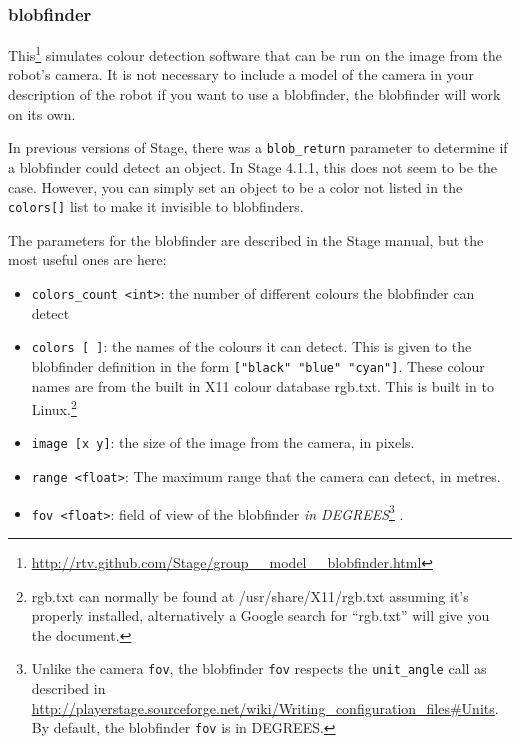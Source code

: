 \documentclass[a4paper]{report}
\begin{document}
\subsubsection{blobfinder}
This\footnote{\url{http://rtv.github.com/Stage/group__model__blobfinder.html}}
simulates colour detection software that can be run on the image from the
robot's camera. It is not necessary to include a model of the camera in
your description of the robot if you want to use a blobfinder, the
blobfinder will work on its own. 

In previous versions of Stage, there was a {\tt blob\_return}
parameter to determine if a blobfinder could detect an object.  In Stage
4.1.1, this does not seem to be the case.  However, you can simply set an
object to be a color not listed in the {\tt colors[]} list to make it invisible
to blobfinders.

The parameters for the blobfinder are described in the Stage manual, but
the most useful ones are here:
\begin{itemize}
      \item \verb|colors_count <int>|: the number of different colours the
            blobfinder can detect
      \item \verb|colors [ ]|: the names of the colours it can detect. This
            is given to the blobfinder definition in the form
            \verb|["black" "blue" "cyan"]|. These colour names are from the
            built in X11 colour database rgb.txt. This is built in to
            Linux.\footnote{rgb.txt can normally be found at
            /usr/share/X11/rgb.txt assuming it's properly installed,
            alternatively a Google search for ``rgb.txt'' will give you the
            document.} 
      \item \verb|image [x y]|: the size of the image from the camera, in pixels.
      \item \verb|range <float>|: The maximum range that the camera can detect, in metres.
      \item \verb|fov <float>|: field of view of the blobfinder 
            \emph{in DEGREES}\footnote{Unlike the camera {\tt fov}, the
            blobfinder {\tt fov} respects the {\tt unit\_angle} call as
            described in
            \url{http://playerstage.sourceforge.net/wiki/Writing\_configuration\_files\#Units}.
            By default, the blobfinder {\tt fov} is in DEGREES.}
           .
\end{itemize}
\end{document}
